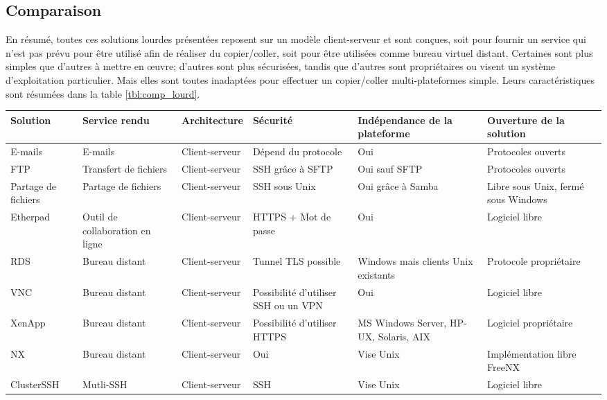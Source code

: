 \subsection{Comparaison}
En résumé, toutes ces solutions lourdes présentées reposent
sur un modèle client-serveur et sont conçues, soit pour fournir un service
qui n'est pas prévu pour être utilisé afin de réaliser du copier/coller,
soit pour être utilisées comme bureau virtuel distant. Certaines sont
plus simples que d'autres à mettre en œuvre; d'autres sont plus sécurisées,
tandis que d'autres sont propriétaires ou visent un système d'exploitation
particulier. Mais elles sont toutes inadaptées pour effectuer
un copier/coller multi-plateformes simple. Leurs caractéristiques sont résumées
dans la table \ref{tbl:comp_lourd}.

\begin{sidewaystable}[!h]
  \centering
  \begin{tabular}{|l|l|l|m{7em}|m{7em}|m{7em}|}
    \hline
    Solution & Service rendu & Architecture & Sécurité & In\-dé\-pen\-dance
    de la plateforme & Ou\-ver\-tu\-re de la solution \\
    \hline
    \hline
    E-mails & E-mails & Client-serveur & Dépend du protocole & Oui &
    Pro\-to\-co\-les ou\-verts \\
    \hline
    FTP & Transfert de fichiers & Client-serveur & SSH grâ\-ce à SFTP & Oui
    sauf SFTP & Pro\-to\-co\-les ou\-verts \\
    \hline
    Partage de fichiers & Partage de fichiers & Client-serveur & SSH sous
    Unix & Oui grâ\-ce à Samba & Libre sous Unix, fermé sous Windows \\
    \hline
    Etherpad & Outil de collaboration en ligne & Client-serveur &
    HTTPS + Mot de passe & Oui & Logiciel libre \\
    \hline
    RDS & Bureau distant & Client-serveur & Tunnel TLS possible & Win\-dows
    mais clients U\-nix existants & Pro\-to\-co\-le pro\-prié\-taire\\
    \hline
    VNC & Bureau distant & Client-serveur & Pos\-si\-bi\-li\-té
    d'u\-ti\-li\-ser SSH ou un VPN & Oui & Logiciel libre \\
    \hline
    XenApp & Bureau distant & Client-serveur & Pos\-si\-bi\-li\-té
    d'u\-ti\-li\-ser HTTPS & MS Win\-dows Ser\-ver, HP-UX, Solaris, AIX &
    Logiciel propriétaire \\
    \hline
    NX & Bureau distant & Client-serveur & Oui & Vise Unix &
    Im\-plé\-men\-ta\-tion libre FreeNX \\
    \hline
    ClusterSSH & Mutli-SSH & Client-serveur & SSH & Vise Unix &
    Logiciel libre \\
    \hline
  \end{tabular}
  \caption{\label{tbl:comp_lourd} Comparaison des solutions lourdes}
\end{sidewaystable}
\clearpage


